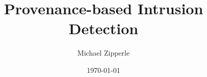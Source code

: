 


\title[Intrustion Detection]{Provenance-based Intrusion Detection}

\author{Michael Zipperle}


\date[]{\today}



